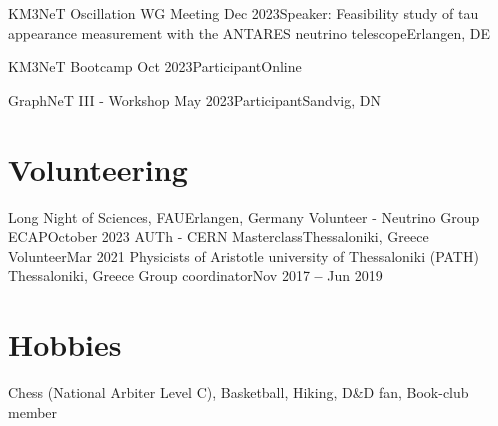 \documentclass[letterpaper,11pt]{article}
\begin{document}
{      \resumeSubheading
      {KM3NeT Oscillation WG Meeting}
      {Dec 2023}{Speaker: Feasibility study of tau appearance measurement with the ANTARES neutrino telescope}{Erlangen, DE}

      \resumeSubheading
      {KM3NeT Bootcamp}
      {Oct 2023}{Participant}{Online}
      
      \resumeSubheading
      {GraphNeT III - Workshop}
      {May 2023}{Participant}{Sandvig, DN}
\resumeSubHeadingListEnd


\section{Volunteering}
    \resumeSubHeadingListStart
    \resumeSubheading
      {Long Night of Sciences, FAU}{Erlangen, Germany}
      {Volunteer - Neutrino Group ECAP}{October 2023}
        \resumeItemListStart
        \resumeItemListEnd
        \resumeSubheading
      {AUTh - CERN Masterclass}{Thessaloniki, Greece}
      {Volunteer}{Mar 2021}
        \resumeItemListStart
        \resumeItemListEnd
    \resumeSubheading
      {Physicists of Aristotle university of Thessaloniki (PATH) }{Thessaloniki, Greece}
      {Group coordinator}{Nov 2017 \textbf{--} Jun 2019}
        \resumeItemListStart
    \resumeItemListEnd    
    \resumeSubHeadingListEnd



\section{Hobbies}
  \resumeSubHeadingListStart
    \small{\item{Chess (National Arbiter Level C), Basketball, Hiking, D\&D fan, Book-club member}}
  \resumeSubHeadingListEnd


}
\end{document}
